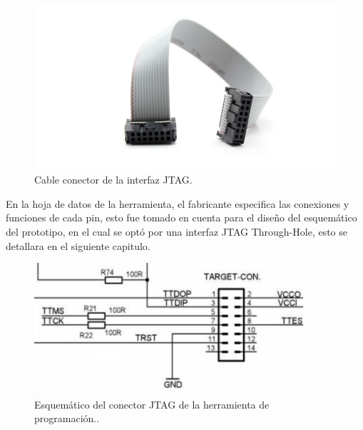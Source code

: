 

\begin{figure}[!h]
	\centering
	\includegraphics[width=120mm,keepaspectratio]{Figures/cableJtag.jpg}
	\caption{ Cable conector de la interfaz JTAG. }
	\label{fig:mspFETtool}
\end{figure}

En la hoja de datos de la herramienta, el fabricante especifica las conexiones y funciones de cada pin, esto fue tomado en cuenta para el diseño del esquemático del prototipo, en el cual se optó por una interfaz JTAG Through-Hole, esto se detallara en el siguiente capitulo. 

\begin{figure}[!h]
	\centering
	\includegraphics[width=100mm,keepaspectratio]{Figures/Jtagfetsch.png}
	\caption{ Esquemático del conector JTAG de la herramienta de programación.. }
	\label{fig:FETtoolsch}
\end{figure}

